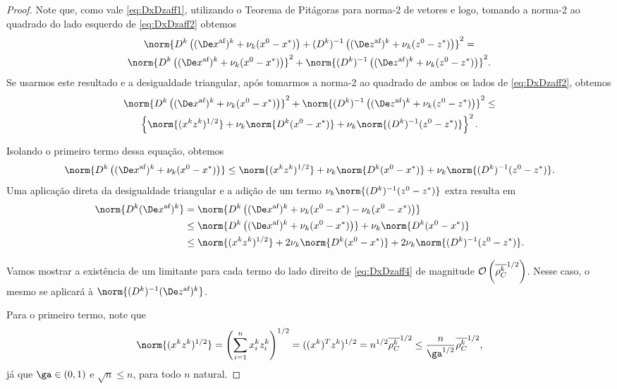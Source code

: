 \begin{proof}
	 Note que, como vale  \eqref{eq:DxDzaff1}, utilizando o Teorema de Pitágoras para norma-2 de vetores e logo, tomando a norma-2 ao quadrado do lado esquerdo de \eqref{eq:DxDzaff2} obtemos
	\begin{multline*}
			 	 \norm{\Dk\left( \dekx +  \nuk (\xzero - \xstar)\right)+ \Dik \left( \dekz  +  \nuk (\zzero - \zstar)\right)}^{2} =\\
	 	 	 	 	 \norm{\Dk\left( \dekx +  \nuk (\xzero - \xstar)\right)}^{2}+ \norm{\Dik \left( \dekz  +  \nuk (\zzero - \zstar)\right)}^{2}.
	\end{multline*}
	 Se  usarmos este resultado e a desigualdade triangular, após tomarmos a norma-2 ao quadrado de ambos os lados de \eqref{eq:DxDzaff2}, obtemos 
	 \begin{multline*}\label{eq:DxDzaff3}
	 \norm{\Dk\left( \dekx +  \nuk (\xzero - \xstar)\right)}^{2}+ \norm{\Dik \left( \dekz  +  \nuk (\zzero - \zstar)\right)}^{2} \leq \\ 
	 \left\{ \norm{(  \xk \zk   )^{1/2}} + \nuk  \norm{\Dk(\xzero - \xstar)} + \nuk  \norm{\Dik(\zzero - \zstar)} \right\}^{2}.
	 \end{multline*}

Isolando o primeiro termo dessa equação, obtemos
\[
\norm{\Dk\left( \dekx +  \nuk (\xzero - \xstar)\right)} \leq  
	  \norm{(  \xk \zk  )^{1/2}} + \nuk  \norm{\Dk(\xzero - \xstar)} + \nuk  \norm{\Dik(\zzero - \zstar)}.
\]
Uma aplicação direta da desigualdade triangular e a adição de um termo  $\nuk  \norm{\Dik(\zzero - \zstar)}$ extra resulta em
\begin{align}
	\norm{\Dk \dekx} & =  \norm{\Dk\left( \dekx  +  \nuk (\xzero - \xstar)  -  \nuk (\xzero - \xstar)\right)} \notag \\ 
				 & \leq	 \norm{\Dk\left( \dekx  +  \nuk (\xzero - \xstar)\right)} +  \nuk \norm{\Dk(\xzero - \xstar)} \notag \\
				 & \leq \norm{(  \xk \zk  )^{1/2}} + 2 \nuk  \norm{\Dk(\xzero - \xstar)} + 2\nuk  \norm{\Dik(\zzero - \zstar)}.\label{eq:DxDzaff4}
\end{align}

Vamos mostrar a existência de um limitante para cada termo do lado direito de \eqref{eq:DxDzaff4} de magnitude $\mathcal{O}\left(\overline{\rho_C^{k}} ^{1/2}\right)$. Nesse caso, o mesmo se aplicará à $\norm{\Dik \dekz }$.

Para o primeiro termo, note que 
\begin{equation}
	\label{eq:DxDzaff5}
	\norm{(  \xk \zk  )^{1/2}} = \left(\sum_{i=1}^{n}\xk_i \zk_i\right)^{1/2} = ((\xk)^{T}\zk)^{1/2} = n^{1/2}\rhoCkb ^{1/2} \leq \frac{n}{\ga^{1/2}}\rhoCkb ^{1/2},
\end{equation}
já que $\ga\in(0,1)$ e $\sqrt{n}\leq n$, para todo $n$ natural.


\end{proof}
